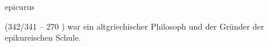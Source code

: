 \documentclass{stex}
\begin{document}
\begin{smodule}[sig=en]{epicurus}
\begin{sparagraph}[style=symdoc]
 (342/341 \vChr{} -- 270 \vChr{}) war ein
altgriechischer Philosoph und der Gründer der epikureischen Schule.
\end{sparagraph}
\end{smodule}
\end{document}
